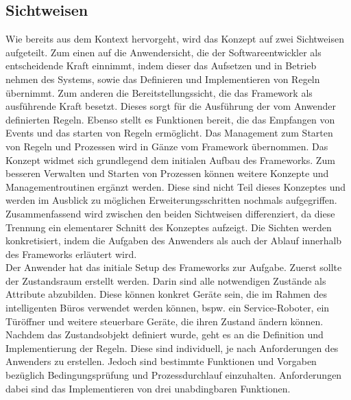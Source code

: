     \subsection{Sichtweisen}
    \label{subsec:sichtweisen}
        Wie bereits aus dem Kontext hervorgeht, wird das Konzept auf zwei Sichtweisen aufgeteilt. Zum einen auf die 
        Anwendersicht, die der Softwareentwickler als entscheidende Kraft einnimmt, indem dieser das Aufsetzen und in 
        Betrieb nehmen des Systems, sowie das Definieren und Implementieren von Regeln übernimmt. Zum anderen die 
        Bereitstellungssicht, die das Framework als ausführende Kraft besetzt. Dieses sorgt für die Ausführung der vom 
        Anwender definierten Regeln. Ebenso stellt es Funktionen bereit, die das Empfangen von Events und das starten 
        von Regeln ermöglicht. Das Management zum Starten von Regeln und Prozessen wird in Gänze vom Framework übernommen. 
        Das Konzept widmet sich grundlegend dem initialen Aufbau des Frameworks. Zum besseren Verwalten und Starten von 
        Prozessen können weitere Konzepte und Managementroutinen ergänzt werden. Diese sind nicht Teil dieses Konzeptes und 
        werden im Ausblick zu möglichen Erweiterungsschritten nochmals aufgegriffen.
        \\
        \linebreak
        Zusammenfassend wird zwischen den beiden Sichtweisen differenziert, da diese Trennung ein elementarer Schnitt des Konzeptes 
        aufzeigt. Die Sichten werden konkretisiert, indem die Aufgaben des Anwenders als auch der Ablauf innerhalb des Frameworks 
        erläutert wird.
        \\
        \linebreak
        Der Anwender hat das initiale Setup des Frameworks zur Aufgabe. Zuerst sollte der Zustandsraum erstellt werden. 
        Darin sind alle notwendigen Zustände als Attribute abzubilden. Diese können konkret Geräte sein, die im Rahmen des 
        intelligenten Büros verwendet werden können, bspw. ein Service-Roboter, ein Türöffner und weitere steuerbare Geräte, die 
        ihren Zustand ändern können. Nachdem das Zustandsobjekt 
        definiert wurde, geht es an die Definition und Implementierung der Regeln. Diese sind individuell, je nach 
        Anforderungen des Anwenders zu erstellen. Jedoch sind bestimmte Funktionen und Vorgaben bezüglich Bedingungsprüfung 
        und Prozessdurchlauf einzuhalten. Anforderungen dabei sind das Implementieren von drei unabdingbaren Funktionen. 
